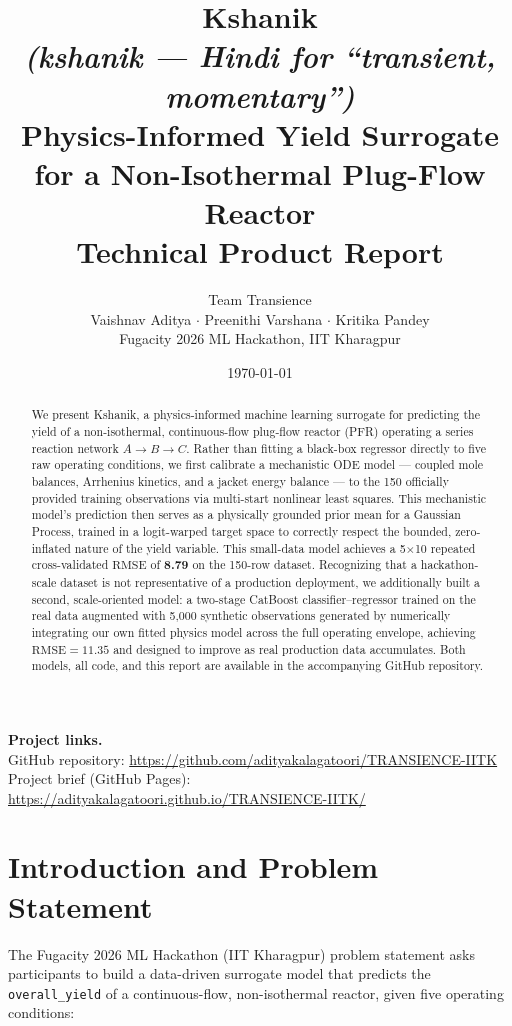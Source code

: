 \documentclass[11pt,a4paper]{article}
\title{
  {\Huge \textbf{Kshanik}}\\[0.15em]
  {\normalsize \textit{(kshanik --- Hindi for ``transient, momentary'')}}\\[0.5em]
  {\Large Physics-Informed Yield Surrogate for a Non-Isothermal Plug-Flow Reactor}\\[0.6em]
  {\large Technical Product Report}
}
\author{
  Team Transience\\[0.3em]
  \small Vaishnav Aditya \quad $\cdot$ \quad Preenithi Varshana \quad $\cdot$ \quad Kritika Pandey\\[0.3em]
  \small Fugacity 2026 ML Hackathon, IIT Kharagpur
}
\date{\small \today}
\newcommand{\rmse}{\text{RMSE}}
\begin{document}
\maketitle

\begin{abstract}
\noindent
We present Kshanik, a physics-informed machine learning surrogate for predicting the yield of a
non-isothermal, continuous-flow plug-flow reactor (PFR) operating a series reaction network
$A \rightarrow B \rightarrow C$. Rather than fitting a black-box regressor directly to five raw
operating conditions, we first calibrate a mechanistic ODE model --- coupled mole balances,
Arrhenius kinetics, and a jacket energy balance --- to the 150 officially provided training
observations via multi-start nonlinear least squares. This mechanistic model's prediction then
serves as a physically grounded prior mean for a Gaussian Process, trained in a logit-warped
target space to correctly respect the bounded, zero-inflated nature of the yield variable. This
small-data model achieves a 5$\times$10 repeated cross-validated $\rmse$ of \textbf{8.79} on the
150-row dataset. Recognizing that a hackathon-scale dataset is not representative of a production
deployment, we additionally built a second, scale-oriented model: a two-stage CatBoost
classifier--regressor trained on the real data augmented with 5{,}000 synthetic observations
generated by numerically integrating our own fitted physics model across the full operating
envelope, achieving $\rmse = 11.35$ and designed to improve as real production data accumulates.
Both models, all code, and this report are available in the accompanying GitHub repository.
\end{abstract}

\vspace{1em}
\noindent\textbf{Project links.}\\
GitHub repository: \url{https://github.com/adityakalagatoori/TRANSIENCE-IITK}\\
Project brief (GitHub Pages): \url{https://adityakalagatoori.github.io/TRANSIENCE-IITK/}

\section{Introduction and Problem Statement}

The Fugacity 2026 ML Hackathon (IIT Kharagpur) problem statement asks participants to build a
data-driven surrogate model that predicts the \texttt{overall\_yield} of a continuous-flow,
non-isothermal reactor, given five operating conditions:
\end{document}
